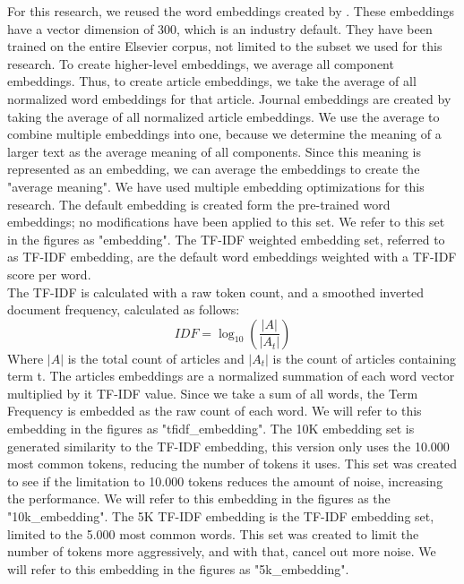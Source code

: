 \documentclass[../../Thesis.tex]{subfiles}
\begin{document}
For this research, we reused the word embeddings created by \citet{Truong2017Thesis}. These embeddings have a vector dimension of 300, which is an industry default. They have been trained on the entire Elsevier corpus, not limited to the subset we used for this research. To create higher-level embeddings, we average all component embeddings. Thus, to create article embeddings, we take the average of all normalized word embeddings for that article. Journal embeddings are created by taking the average of all normalized article embeddings. We use the average to combine multiple embeddings into one, because we determine the meaning of a larger text as the average meaning of all components. Since this meaning is represented as an embedding, we can average the embeddings to create the "average meaning". We have used multiple embedding optimizations for this research.
The default embedding is created form the pre-trained word embeddings; no modifications have been applied to this set. We refer to this set in the figures as "embedding".
The TF-IDF weighted embedding set, referred to as TF-IDF embedding, are the default word embeddings weighted with a TF-IDF score per word.\\
The TF-IDF is calculated with a raw token count, and a smoothed inverted document frequency, calculated as follows:\\
\begin{equation}
IDF = \log_{10}(\dfrac{|A|}{|A_t|})
\end{equation}
Where $|A|$ is the total count of articles and $|A_t|$ is the count of articles containing term t.
The articles embeddings are a normalized summation of each word vector multiplied by it TF-IDF value. Since we take a sum of all words, the Term Frequency is embedded as the raw count of each word. We will refer to this embedding in the figures as "tfidf\_embedding".
The 10K embedding set is generated similarity to the TF-IDF embedding, this version only uses the 10.000 most common tokens, reducing the number of tokens it uses. This set was created to see if the limitation to 10.000 tokens reduces the amount of noise, increasing the performance. We will refer to this embedding in the figures as the "10k\_embedding".
The 5K TF-IDF embedding is the TF-IDF embedding set, limited to the 5.000 most common words. This set was created to limit the number of tokens more aggressively, and with that, cancel out more noise. We will refer to this embedding in the figures as "5k\_embedding".
\end{document}
